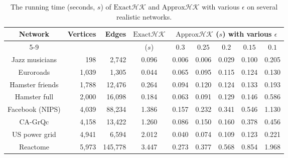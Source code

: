 \documentclass[10pt,twocolumn,twoside]{IEEEtran}
\begin{document}
\begin{table}[htbp]
    \centering
    \normalsize
    \begin{threeparttable}
        \caption{The running time (seconds, \(s\)) of \(\text{Exact}\mathcal{HK}\) and \(\text{Approx}\mathcal{HK}\) with various \(\epsilon\) on several realistic networks.}
        \label{tab:runtime_comparison}
        \begin{tabular}{crrcccccc}
            \toprule
            \multirow{2}{*}{Network}                      &
            \multirow{2}{*}{Vertices}                     &
            \multirow{2}{*}{Edges}                        &
            \multirow{2}{*}{\(\text{Exact}\mathcal{HK}\)} &
            \multicolumn{5}{c}{\(\text{Approx}\mathcal{HK}\) (\(s\)) with various \(\epsilon\)}                                                 \\
            \cmidrule{5-9}                                &           &           & (\(s\)) & \(0.3\) & \(0.25\) & \(0.2\) & \(0.15\) & \(0.1\) \\
            \midrule
            Jazz musicians                                & 198       & 2,742     & 0.096   & 0.006   & 0.006    & 0.029   & 0.100    & 0.205   \\
            Euroroads                                     & 1,039     & 1,305     & 0.044   & 0.065   & 0.095    & 0.115   & 0.124    & 0.130   \\
            Hamster friends                               & 1,788     & 12,476    & 0.264   & 0.094   & 0.120    & 0.124   & 0.133    & 0.193   \\
            Hamster full                                  & 2,000     & 16,098    & 0.184   & 0.063   & 0.091    & 0.129   & 0.146    & 0.586   \\
            Facebook (NIPS)                               & 4,039     & 88,234    & 1.386   & 0.157   & 0.232    & 0.341   & 0.546    & 1.130   \\
            CA-GrQc                                       & 4,158     & 13,422    & 1.260   & 0.086   & 0.150    & 0.160   & 0.378    & 0.456   \\
            US power grid                                 & 4,941     & 6,594     & 2.012   & 0.040   & 0.074    & 0.109   & 0.123    & 0.221   \\
            Reactome                                      & 5,973     & 145,778   & 3.447   & 0.273   & 0.377    & 0.568   & 0.854    & 1.968   \\

\end{tabular}
\end{threeparttable}
\end{table}
\end{document}
